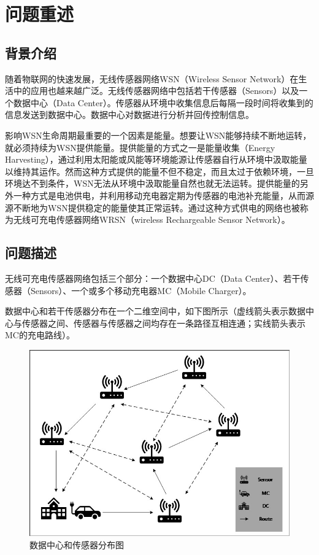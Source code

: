 \documentclass{article}
\begin{document}
\section{问题重述}                                          %
\subsection{背景介绍}
随着物联网的快速发展，无线传感器网络WSN（Wireless Sensor Network）在生活中的应用也越来越广泛。无线传感器网络中包括若干传感器（Sensors）以及一个数据中心（Data Center）。传感器从环境中收集信息后每隔一段时间将收集到的信息发送到数据中心。数据中心对数据进行分析并回传控制信息。

影响WSN生命周期最重要的一个因素是能量。想要让WSN能够持续不断地运转，就必须持续为WSN提供能量。提供能量的方式之一是能量收集（Energy Harvesting），通过利用太阳能或风能等环境能源让传感器自行从环境中汲取能量以维持其运作。然而这种方式提供的能量不但不稳定，而且太过于依赖环境，一旦环境达不到条件，WSN无法从环境中汲取能量自然也就无法运转。提供能量的另外一种方式是电池供电，并利用移动充电器定期为传感器的电池补充能量，从而源源不断地为WSN提供稳定的能量使其正常运转。通过这种方式供电的网络也被称为无线可充电传感器网络WRSN（wireless Rechargeable Sensor Network）。
\subsection{问题描述}
无线可充电传感器网络包括三个部分：一个数据中心DC（Data Center）、若干传感器（Sensors）、一个或多个移动充电器MC（Mobile Charger）。

数据中心和若干传感器分布在一个二维空间中，如下图所示（虚线箭头表示数据中心与传感器之间、传感器与传感器之间均存在一条路径互相连通；实线箭头表示MC的充电路线）。

\begin{figure}[H]%
    \centering
    \includegraphics[scale=0.5]{1.jpg}
    \caption{数据中心和传感器分布图}
\end{figure}
\end{document}

